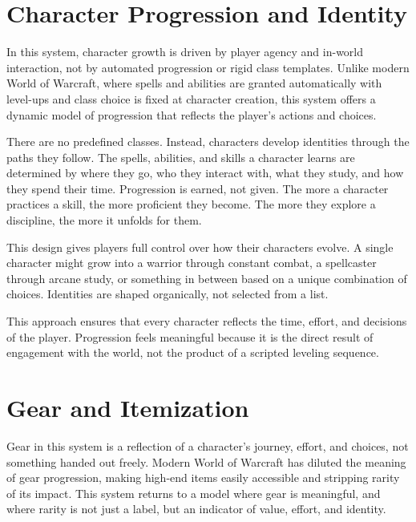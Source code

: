 \section{Character Progression and Identity}

In this system, character growth is driven by player agency and in-world interaction, not by automated progression or rigid class templates. Unlike modern World of Warcraft, where spells and abilities are granted automatically with level-ups and class choice is fixed at character creation, this system offers a dynamic model of progression that reflects the player's actions and choices.

There are no predefined classes. Instead, characters develop identities through the paths they follow. The spells, abilities, and skills a character learns are determined by where they go, who they interact with, what they study, and how they spend their time. Progression is earned, not given. The more a character practices a skill, the more proficient they become. The more they explore a discipline, the more it unfolds for them.

This design gives players full control over how their characters evolve. A single character might grow into a warrior through constant combat, a spellcaster through arcane study, or something in between based on a unique combination of choices. Identities are shaped organically, not selected from a list.

This approach ensures that every character reflects the time, effort, and decisions of the player. Progression feels meaningful because it is the direct result of engagement with the world, not the product of a scripted leveling sequence.











\section{Gear and Itemization}

Gear in this system is a reflection of a character's journey, effort, and choices, not something handed out freely. Modern World of Warcraft has diluted the meaning of gear progression, making high-end items easily accessible and stripping rarity of its impact. This system returns to a model where gear is meaningful, and where rarity is not just a label, but an indicator of value, effort, and identity.

